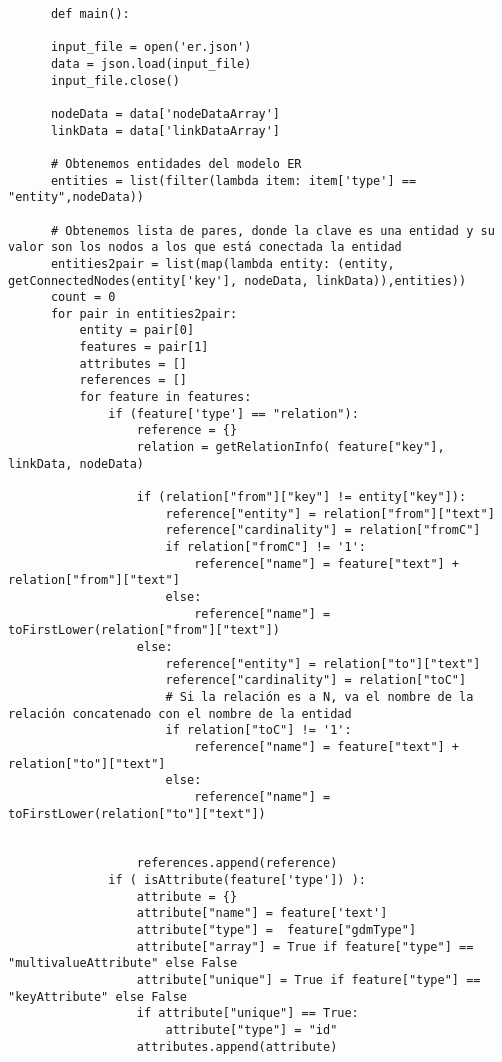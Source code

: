 \begin{code}
    \label{code:er-to-gdm}
    \begin{verbatim}
      def main():
    
      input_file = open('er.json') 
      data = json.load(input_file) 
      input_file.close() 
      
      nodeData = data['nodeDataArray']
      linkData = data['linkDataArray']
    
      # Obtenemos entidades del modelo ER
      entities = list(filter(lambda item: item['type'] == "entity",nodeData))
    
      # Obtenemos lista de pares, donde la clave es una entidad y su valor son los nodos a los que está conectada la entidad
      entities2pair = list(map(lambda entity: (entity, getConnectedNodes(entity['key'], nodeData, linkData)),entities))
      count = 0
      for pair in entities2pair:
          entity = pair[0]
          features = pair[1]
          attributes = []
          references = []
          for feature in features:
              if (feature['type'] == "relation"):
                  reference = {}
                  relation = getRelationInfo( feature["key"], linkData, nodeData)
    
                  if (relation["from"]["key"] != entity["key"]):
                      reference["entity"] = relation["from"]["text"]
                      reference["cardinality"] = relation["fromC"]
                      if relation["fromC"] != '1':
                          reference["name"] = feature["text"] + relation["from"]["text"]
                      else:
                          reference["name"] = toFirstLower(relation["from"]["text"])
                  else:
                      reference["entity"] = relation["to"]["text"]
                      reference["cardinality"] = relation["toC"]
                      # Si la relación es a N, va el nombre de la relación concatenado con el nombre de la entidad
                      if relation["toC"] != '1':
                          reference["name"] = feature["text"] + relation["to"]["text"]
                      else:
                          reference["name"] = toFirstLower(relation["to"]["text"])
    
    
                  references.append(reference)
              if ( isAttribute(feature['type']) ):
                  attribute = {}
                  attribute["name"] = feature['text']
                  attribute["type"] =  feature["gdmType"]
                  attribute["array"] = True if feature["type"] == "multivalueAttribute" else False
                  attribute["unique"] = True if feature["type"] == "keyAttribute" else False
                  if attribute["unique"] == True:
                      attribute["type"] = "id"
                  attributes.append(attribute)
          

\end{verbatim}
\end{code}
